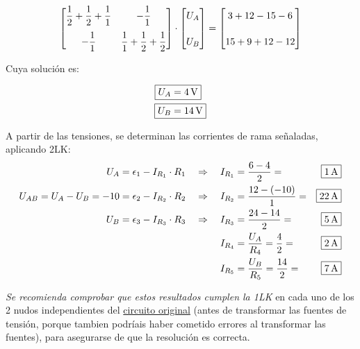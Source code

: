\documentclass[10pt]{article}
\begin{document}
\begin{equation*}
    \begin{bmatrix}
      \dfrac{1}{2}+\dfrac{1}{2}+\dfrac{1}{1} & -\dfrac{1}{1}\\[10pt]
      -\dfrac{1}{1} & \dfrac{1}{1}+\dfrac{1}{2}+\dfrac{1}{2}
    \end{bmatrix}
    \cdot
    \begin{bmatrix}
      \vphantom{\dfrac{1}{1}} U_A\\[10pt]
      \vphantom{\dfrac{1}{1}} U_B
    \end{bmatrix}
    =
    \begin{bmatrix}
      \vphantom{\dfrac{1}{1}} 3+12-15-6\\[10pt]
      \vphantom{\dfrac{1}{1}} 15+9+12-12
    \end{bmatrix}
\end{equation*}

\vspace{5mm}
Cuya solución es:

\vspace{-6mm}
\begin{align*}
    \Aboxed{U_A &= \qty{4}{\volt}}\\
    \Aboxed{U_B &= \qty{14}{\volt}}
\end{align*}

\vspace{4mm}
A partir de las tensiones, se determinan las corrientes de rama señaladas, aplicando 2LK:
\begin{align*}
  U_A = \epsilon_1-I_{R_1}\cdot R_1 
  \quad &\Rightarrow \quad 
  I_{R_1} = \dfrac{6-4}{2} = \Aboxed{\qty{1}{\ampere}}\\
  U_{AB} = U_A - U_B = -10 = \epsilon_2 - I_{R_2}\cdot R_2 
  \quad &\Rightarrow \quad 
  I_{R_2} = \dfrac{12-(-10)}{1} = \Aboxed{\qty{22}{\ampere}}\\
  U_B = \epsilon_3 - I_{R_3}\cdot R_3 
  \quad &\Rightarrow \quad 
  I_{R_3} = \dfrac{24-14}{2} = \Aboxed{\qty{5}{\ampere}}\\
  &\qquad\;\; I_{R_4} = \dfrac{U_A}{R_4} = \dfrac{4}{2} = \Aboxed{\qty{2}{\ampere}}\\
  &\qquad\;\; I_{R_5} = \dfrac{U_B}{R_5} = \dfrac{14}{2} = \Aboxed{\qty{7}{\ampere}}
\end{align*}

\vspace{2mm}
\emph{Se recomienda comprobar que estos resultados cumplen la 1LK} en cada uno de los 2 nudos independientes del \underline{circuito original} (antes de transformar las fuentes de tensión, porque tambien podríais haber cometido errores al transformar las fuentes), para asegurarse de que la resolución es correcta.
\end{document}
